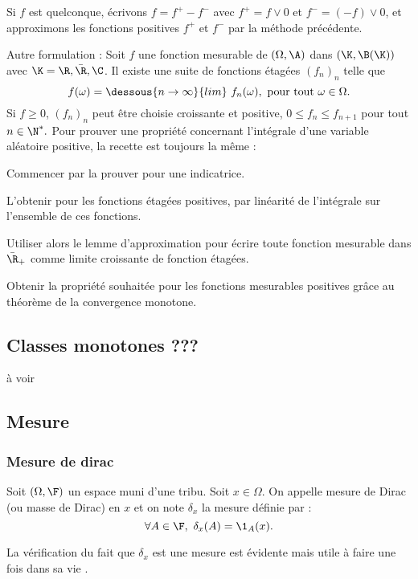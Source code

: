 Si $f$ est quelconque, écrivons $f = f^+ - f^-$ avec $f^+ = f \lor 0$ et $f^- = (-f) \lor 0$, et approximons les fonctions positives $f^+$ et $f^-$ par la méthode précédente.
\epf

Autre formulation :
    Soit $f$ une fonction mesurable de $(\Omega,\A)$ dans $(\K, \B(\K))$ avec $\K = \R, \bar{\R}, \C$. Il existe une suite de fonctions étagées $(f_n)_n$ telle que $$f(\omega) = \dessous{n \to \infty}{lim} ~ f_n(\omega), \text{ pour tout } \omega \in \Omega.$$
    Si $f \geq 0$, $(f_n)_n$ peut être choisie croissante et positive, \ie $0 \leq f_n \leq f_{n+1}$ pour tout $n \in \N^*.$
\el
\bn
Pour prouver une propriété concernant l'intégrale d'une variable aléatoire positive, la recette est toujours la même : 
\ben
    \item Commencer par la prouver pour une indicatrice.
    \item L'obtenir pour les fonctions étagées positives, par linéarité de l'intégrale sur l'ensemble de ces fonctions.
    \item Utiliser alors le lemme d'approximation pour écrire toute fonction mesurable dans $\bar{\R}_+$ comme limite croissante de fonction étagées.
    \item Obtenir la propriété souhaitée pour les fonctions mesurables positives grâce au théorème de la convergence monotone.
\een
\en
\subsection{Classes monotones ???}
à voir

\subsection{Mesure}

\bd[Axiomes]
\ed

\bp
\ep

\subsubsection{Mesure de dirac}
Soit $(\Omega, \F)$ un espace muni d'une tribu. Soit $x\in \Omega$. On appelle mesure de Dirac (ou masse de Dirac) en $x$ et on note $\delta_x$ la mesure définie par :$$\forall A \in \F, ~ \delta_x(A) = \1_A(x).$$

\bn
La vérification du fait que $\delta_x$ est une mesure est évidente mais utile à faire une fois dans sa vie .
\en

